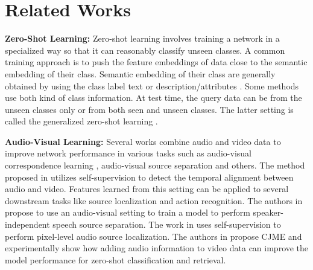 \documentclass[10pt,twocolumn,letterpaper]{article}
\begin{document}
\section{Related Works}
\textbf{Zero-Shot Learning:}
Zero-shot learning \cite{socher2013zero, xian2016latent, akata2015evaluation, xian2018feature, chao2016empirical, frome2013devise, romera2015embarrassingly, lampert2013attribute, norouzi2013zero, akata2015label, kumar2018generalized, kodirov2017semantic} involves training a network in a specialized way so that it can reasonably classify unseen classes. A common training approach is to push the feature embeddings of data close to the semantic embedding of their class. Semantic embedding of their class are generally obtained by using the class label text \cite{frome2013devise, norouzi2013zero, xian2018feature} or description/attributes \cite{lampert2013attribute, romera2015embarrassingly, xian2018feature}.
Some methods \cite{akata2015label, xian2016latent, akata2015evaluation} use both kind of class information. 
At test time, the query data can be from the unseen classes only \cite{lampert2013attribute} or from both seen and unseen classes. The latter setting is called the generalized zero-shot learning \cite{chao2016empirical}. 


\textbf{Audio-Visual Learning:}
Several works combine audio and video data to improve network performance in various tasks such as audio-visual correspondence learning \cite{aytar2016soundnet, owens2016ambient, arandjelovic2017look, owens2018audio}, audio-visual source separation \cite{zhao2018sound, gao2018learning} and others. The method proposed in \cite{owens2016ambient} utilizes self-supervision to detect the temporal alignment between audio and video. Features learned from this setting can be applied to several downstream tasks like source localization and action recognition. The authors in \cite{ephrat2018looking} propose to use an audio-visual setting to train a model to perform speaker-independent speech source separation. The work in \cite{zhao2018sound} uses self-supervision to perform pixel-level audio source localization. The authors in \cite{parida2020coordinated} propose CJME and experimentally show how adding audio information to video data can improve the model performance for zero-shot classification and retrieval. 
\end{document}
